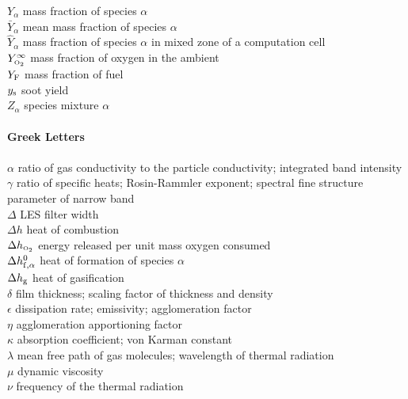 \begin{tabbing}
$Y_\alpha$                \> mass fraction of species $\alpha$   \\
$\bar{Y}_\alpha$          \> mean mass fraction of species $\alpha$   \\
$\hat{Y}_\alpha$          \> mass fraction of species $\alpha$ in mixed zone of a computation cell \\
$Y_{\text{\tiny \hbox{O}$_2$}}^\infty$          \> mass fraction of oxygen in the ambient   \\
$Y_{\rm F}$               \> mass fraction of fuel   \\
$y_{\rm s}$               \> soot yield \\
$Z_\alpha$                \> species mixture $\alpha$   \\
\hspace{0.1in}            \> \\
{\bf Greek Letters}       \> \\
\hspace{0.1in}            \> \\
$\alpha$                  \> ratio of gas conductivity to the particle conductivity; integrated band intensity \\
$\gamma$                  \> ratio of specific heats; Rosin-Rammler exponent; spectral fine structure parameter of narrow band \\
$\Delta$                  \> LES filter width \\
$\Delta h$                \> heat of combustion \\
$\Delta h_{\text{\tiny \hbox{O}$_2$}}$          \> energy released per unit mass oxygen consumed \\
$\Delta h_{\rm f,\alpha}^0$ \> heat of formation of species $\alpha$ \\
$\Delta h_{\rm g}$        \> heat of gasification \\
$\delta$                  \> film thickness; scaling factor of thickness and density \\
$\epsilon$                \> dissipation rate; emissivity; agglomeration factor \\
$\eta$                    \> agglomeration apportioning factor \\
$\kappa$                  \> absorption coefficient; von Karman constant \\
$\lambda$                 \> mean free path of gas molecules; wavelength of thermal radiation\\
$\mu$                     \> dynamic viscosity \\
$\nu$                     \> frequency of the thermal radiation \\

\end{tabbing}
